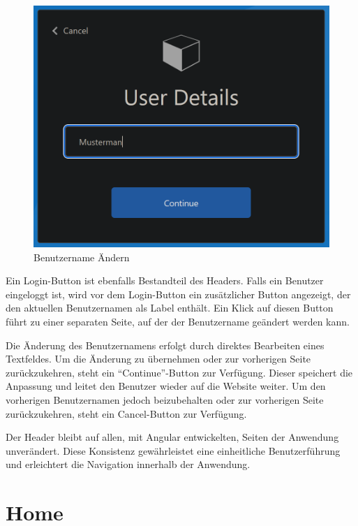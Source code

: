 \begin{figure} [h t]
    \centering
    \includegraphics[scale=0.4]{pics/benutzername_aendern.PNG}
    \caption{Benutzername Ändern}
    \label{fig:benutzername-aendern}
\end{figure}

Ein Login-Button ist ebenfalls Bestandteil des Headers. Falls ein Benutzer eingeloggt 
ist, wird vor dem Login-Button ein zusätzlicher Button angezeigt, der den aktuellen 
Benutzernamen als Label enthält. Ein Klick auf diesen Button führt zu einer separaten 
Seite, auf der der Benutzername geändert werden kann.

Die Änderung des Benutzernamens erfolgt durch direktes Bearbeiten eines Textfeldes. 
Um die Änderung zu übernehmen oder zur vorherigen Seite zurückzukehren, steht ein 
``Continue''-Button zur Verfügung. Dieser speichert die Anpassung und leitet den Benutzer 
wieder auf die Website weiter. Um den vorherigen Benutzernamen jedoch beizubehalten 
oder zur vorherigen Seite zurückzukehren, steht ein Cancel-Button zur Verfügung. 

Der Header bleibt auf allen, mit Angular entwickelten, Seiten der Anwendung unverändert. 
Diese Konsistenz gewährleistet eine einheitliche Benutzerführung und erleichtert die 
Navigation innerhalb der Anwendung.


\section{Home}

